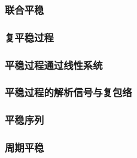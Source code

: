     \subsubsection{联合平稳}
    \subsubsection{复平稳过程}
    \subsubsection{平稳过程通过线性系统}
    \subsubsection{平稳过程的解析信号与复包络}
    \subsubsection{平稳序列}
    \subsubsection{周期平稳}


